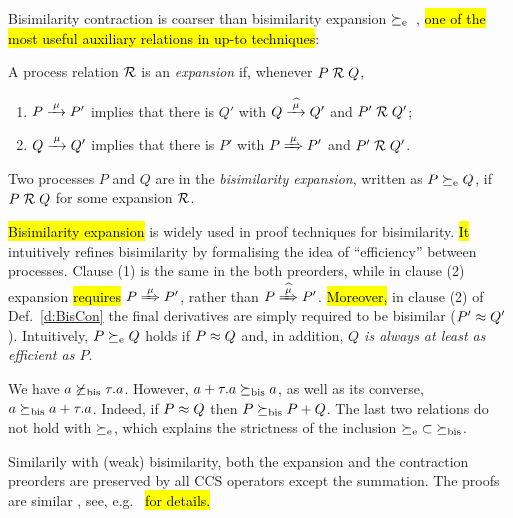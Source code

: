 Bisimilarity contraction is coarser than bisimilarity expansion
$\mathrel{\succeq_{\rm{e}}}$~\cite{arun1992efficiency,sangiorgi2015equations}, \hl{one of the
most useful auxiliary relations in up-to techniques}:
\begin{definition}[expansion]
\label{d:expa}
A process relation ${{\cal R}}$
  is an \emph{expansion} if, whenever $P\mathrel{\cal R} Q$,
 \begin{enumerate}
 \item   $P \arr\mu P'$ implies that there is $Q'$ with $Q \arcap \mu  Q'$
  and $P' \mathrel{\cal R} Q'$;
 \item $Q \arr\mu Q'$ implies that there is $P'$ with $P \Arr \mu P'$ and $P' \mathrel{\cal R} Q'$.
 \end{enumerate}
Two processes $P$ and $Q$ are in the \emph{bisimilarity
  expansion}, written as $P \mathrel{\succeq_{\rm{e}}} Q$, if $P \mathrel{\cal R} Q$ for some expansion ${\cal R}$.
 \end{definition}
\hl{Bisimilarity expansion} is widely used in proof techniques for bisimilarity.
\hl{It} intuitively refines bisimilarity by 
formalising the idea of ``efficiency'' between processes.
Clause (1) is the same in the both preorders, while in clause (2) expansion \hl{requires}
$P \Arr \mu P'$, rather than $P \Arcap \mu P'$.
\hl{Moreover,} in clause (2) of Def.~\ref{d:BisCon} the final derivatives
are simply required to be bisimilar ($P' \approx Q'$).
Intuitively, $P \mathrel{\succeq_{\rm{e}}} Q$ holds if $P\approx Q$ and, in addition, \emph{$Q$
  is always at least as efficient as $P$}.

\begin{example}
\label{exa:contr}
We have %
 $ a \not  \mathrel{\succeq_{\rm{bis}}} \tau. a$. However,
$a+ \tau . a \mathrel{\succeq_{\rm{bis}}} a$, as well as its converse, 
$  a \mathrel{\succeq_{\rm{bis}}} a +
\tau . a $. Indeed, if $P \approx Q$ then 
$  P  \mathrel{\succeq_{\rm{bis}}} P +Q$. The last two relations do not hold with 
$\mathrel{\succeq_{\rm{e}}}$, which explains the strictness of the inclusion
 ${\mathrel{\succeq_{\rm{e}}}} \subset {\mathrel{\succeq_{\rm{bis}}}}$. 
\end{example} 

Similarily with (weak) bisimilarity, both the expansion and the
contraction preorders are preserved by all CCS operators except the
summation. The proofs are similar ,
see, e.g.~\cite{sangiorgi2017equations} \hl{for details.}

